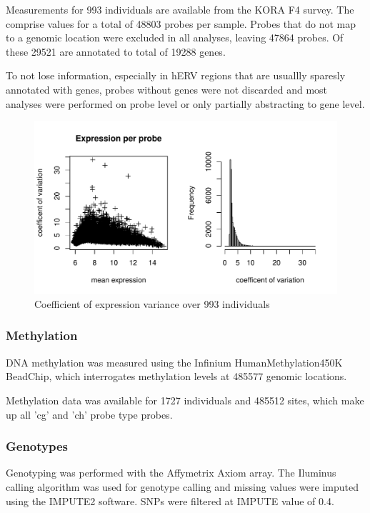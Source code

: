 \documentclass[a4paper,12pt]{article}
\begin{document}
Measurements for 993 individuals are available from the KORA F4 survey. The comprise values for a total of 48803 probes per sample. Probes that do not map to a genomic location were excluded in all analyses, leaving 47864 probes. Of these 29521 are annotated to total of 19288 genes. 

To not lose information, especially in hERV regions that are usuallly sparesly annotated with genes, probes without genes were not discarded and most analyses were performed on probe level or only partially abstracting to gene level. 

\begin{figure}[tb]
	\includegraphics[scale = 1, keepaspectratio = true]{../figures/expr_var}  
	\caption{Coefficient of expression variance over 993 individuals}
    \label{fig:expr.var}
\end{figure}

\subsubsection{Methylation}
DNA methylation was measured using the Infinium HumanMethylation450K BeadChip, which interrogates methylation levels at 485577 genomic locations.  

Methylation data was available for 1727 individuals and 485512 sites, which make up all 'cg' and 'ch' probe type probes.
 
\subsubsection{Genotypes}
Genotyping was performed with the Affymetrix Axiom array. The Iluminus calling algorithm was used for genotype calling and missing values were imputed using the IMPUTE2 software\cite{10.1371/journal.pgen.1000529}. SNPs were filtered at IMPUTE value of 0.4. 
\end{document}
